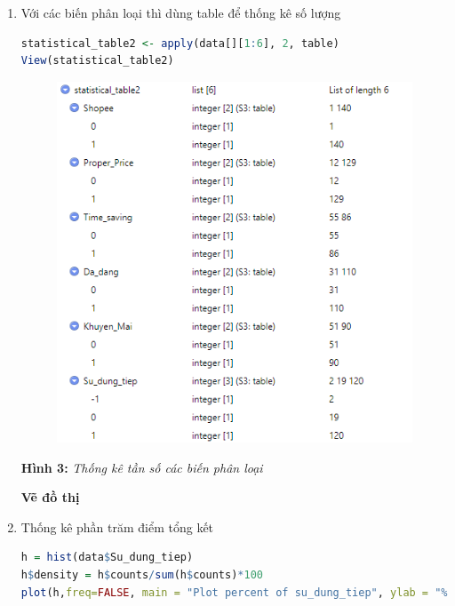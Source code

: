 \documentclass[a4paper]{article}
\theoremstyle{definition}
\begin{document}
\begin{itemize}
\begin{itemize}
\begin{enumerate}
\item Với các biến phân loại thì dùng table để thống kê số lượng
\begin{lstlisting}[language=R, caption=Làm rõ dữ liệu (tiếp theo)]
statistical_table2 <- apply(data[][1:6], 2, table)
View(statistical_table2)
\end{lstlisting}
        \begin{figure}[H]
            \centering
            \includegraphics[scale=0.8]{rieng_4.png}
            \label{fig:my_label}
        \end{figure}
        \begin{center}
            \textbf{Hình 3: }\textit{Thống kê tần số các biến phân loại}
        \end{center}
\newpage 
\textbf{Vẽ đồ thị}
\item Thống kê phần trăm điểm tổng kết
\begin{lstlisting}[language=R, caption=Làm rõ dữ liệu (tiếp theo)]
h = hist(data$Su_dung_tiep)
h$density = h$counts/sum(h$counts)*100
plot(h,freq=FALSE, main = "Plot percent of su_dung_tiep", ylab = "%", xlab = "Quyet_dinh", border="brown", col="orange")
\end{lstlisting}
        \begin{figure}[H]
            \centering

\end{figure}
\end{enumerate}
\end{itemize}
\end{itemize}
\end{document}
